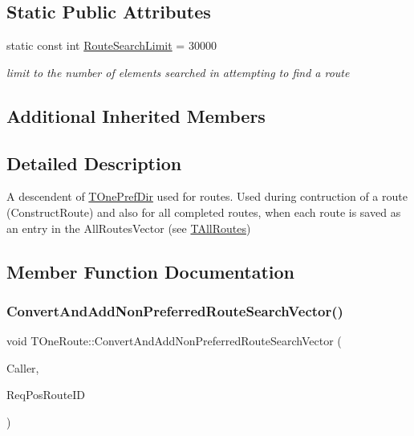 \subsection*{Static Public Attributes}
\begin{DoxyCompactItemize}
\item 
\mbox{\label{class_t_one_route_aa2d1990ed4b4884eb45ac54644fe749c}} 
static const int \mbox{\hyperlink{class_t_one_route_aa2d1990ed4b4884eb45ac54644fe749c}{Route\+Search\+Limit}} = 30000
\begin{DoxyCompactList}\small\item\em limit to the number of elements searched in attempting to find a route \end{DoxyCompactList}\end{DoxyCompactItemize}
\subsection*{Additional Inherited Members}


\subsection{Detailed Description}
A descendent of \mbox{\hyperlink{class_t_one_pref_dir}{T\+One\+Pref\+Dir}} used for routes. Used during contruction of a route (Construct\+Route) and also for all completed routes, when each route is saved as an entry in the All\+Routes\+Vector (see \mbox{\hyperlink{class_t_all_routes}{T\+All\+Routes}}) 

\subsection{Member Function Documentation}
\mbox{\label{class_t_one_route_a53496c398dcdb3a644801c4e74d47d01}} 
\subsubsection{\texorpdfstring{Convert\+And\+Add\+Non\+Preferred\+Route\+Search\+Vector()}{ConvertAndAddNonPreferredRouteSearchVector()}}
{\footnotesize\ttfamily void T\+One\+Route\+::\+Convert\+And\+Add\+Non\+Preferred\+Route\+Search\+Vector (\begin{DoxyParamCaption}\item[{int}]{Caller,  }\item[{\mbox{\hyperlink{class_i_d_int}{I\+D\+Int}}}]{Req\+Pos\+Route\+ID }\end{DoxyParamCaption})}

